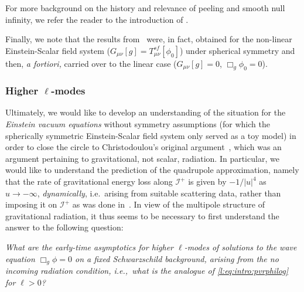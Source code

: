 \documentclass[11pt,english]{article}
\numberwithin{equation}{section}
\theoremstyle{remark}
\theoremstyle{plain}
\theoremstyle{remark}
\renewcommand{\(}{\left(}
\renewcommand{\)}{\right)}
\begin{document}
For more background on the history and relevance of peeling and smooth null infinity, we refer the reader to the introduction of \cite{I}. 

Finally, we note that the results from~\cite{I} were, in fact, obtained for the non-linear Einstein-Scalar field system ($G_{\mu\nu}[g]=T_{\mu\nu}^{sf}[\phi_0]$) under spherical symmetry and then, \textit{a fortiori,} carried over to the linear case ($G_{\mu\nu}[g]=0$, $\Box_g \phi_0=0 $). 


\subsubsection{Higher \texorpdfstring{$\ell$}{l}-modes}
Ultimately, we would like to develop an understanding of the situation for the \textit{Einstein vacuum equations} without symmetry assumptions (for which the spherically symmetric Einstein-Scalar field system only served as a toy model) in order to close the circle to Christodoulou's original argument~\cite{Chr02}, which was an argument pertaining to gravitational, not scalar, radiation.
In particular, we would like to understand the prediction of the quadrupole approximation, namely that the rate of gravitational energy loss along $\mathcal I^+$ is given by $-1/|u|^4$ as $u\to-\infty$, \textit{dynamically}, i.e.\ arising from suitable scattering data, rather than imposing it on $\mathcal I^+$ as was done in~\cite{Chr02}.
In view of the multipole structure of gravitational radiation, it thus seems to be necessary to first understand the answer to the following question: 

\textit{What are the early-time asymptotics for higher $\ell$-modes of solutions to the wave equation $\Box_g \phi=0$ on  a fixed Schwarzschild background, arising from the no incoming radiation condition, i.e.,\ what is the analogue of \eqref{l:eq:intro:pvrphilog} for $\ell>0$? }
\end{document}
